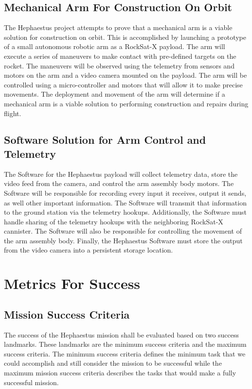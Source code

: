 \documentclass[letterpaper,10pt]{article}
\begin{document}
\subsection{Mechanical Arm For Construction On Orbit}
The Hephaestus project attempts to prove that a mechanical arm is a viable solution for construction on orbit.
This is accomplished by launching a prototype of a small autonomous robotic arm as a RockSat-X payload.
The arm will execute a series of maneuvers to make contact with pre-defined targets on the rocket.
The maneuvers will be observed using the telemetry from sensors and motors on the arm and a video
camera mounted on the payload.
The arm will be controlled using a micro-controller and motors that will allow it to make precise movements.
The deployment and movement of the arm will determine if a mechanical arm is a viable solution to
performing construction and repairs during flight.
\subsection{Software Solution for Arm Control and Telemetry}
The Software for the Hephaestus payload will collect telemetry data, store the video feed from the
camera, and control the arm assembly body motors.
The Software will be responsible for recording every input it receives, output it sends, as well other
important information. The Software will transmit that information to the ground station via the
telemetry hookups.
Additionally, the Software must handle sharing of the telemetry hookups with the neighboring RockSat-X
cannister. 
The Software will also be responsible for controlling the movement of the arm assembly body. 
Finally, the Hephaestus Software must store the output from the video camera into a persistent storage
location.

\section{Metrics For Success}
\subsection{Mission Success Criteria}
The success of the Hephaestus mission shall be evaluated based on two success
landmarks. These landmarks are the minimum success criteria and the maximum
success criteria. The minimum success criteria defines the minimum task that we
could accomplish and still consider the mission to be successful while the
maximum mission success criteria describes the tasks that would make a fully
successful mission.
\end{document}
